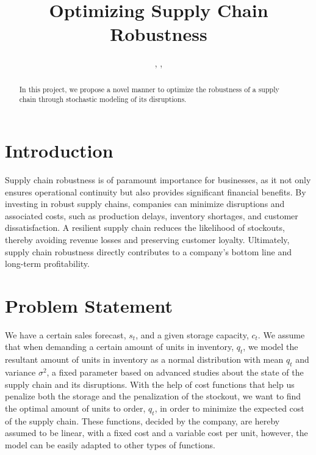 \documentclass{OptiFlow}
\begin{document}

\title{Optimizing Supply Chain Robustness}

\author{, , }

\address{
}

\begin{abstract}
In this project, we propose a novel manner to optimize the robustness of a supply chain through stochastic modeling of its disruptions.
\end{abstract}

\maketitle

\section{Introduction}\label{sec1}
Supply chain robustness is of paramount importance for businesses, as it not only ensures operational continuity 
but also provides significant financial benefits. By investing in robust supply chains, 
companies can minimize disruptions and associated costs, such as production delays, inventory shortages, 
and customer dissatisfaction. A resilient supply chain reduces the likelihood of stockouts, thereby avoiding revenue losses and preserving customer loyalty. 
Ultimately, supply chain robustness directly contributes to a company's bottom line and long-term profitability.

\section{Problem Statement}\label{sec2}
We have a certain sales forecast, $s_t$, and a given storage capacity, $c_t$.
We assume that when demanding a certain amount of units in inventory, $q_t$, we model the resultant amount of units in inventory
as a normal distribution with mean $q_t$ and variance $\sigma^2$, a fixed parameter based on advanced studies about the state of the supply chain and its disruptions.
With the help of cost functions that help us penalize both the storage and the penalization of the stockout, we want to find the optimal amount of units to order, $q_t$, in order to minimize the expected cost of the supply chain.
These functions, decided by the company, are hereby assumed to be linear, with a fixed cost and a variable cost per unit, however,
the model can be easily adapted to other types of functions.
\end{document}
